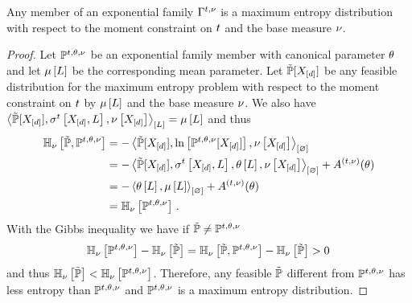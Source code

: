 \begin{lemma}\label{lem:expFamilyMaxEnt}
    Any member of an exponential family $\Gamma^{t,\nu}$ is a maximum entropy distribution with respect to the moment constraint on $t$ and the base measure $\nu$.
\end{lemma}
\begin{proof}
    Let $\mathbb{P}^{t,\theta,\nu}$ be an exponential family member with canonical parameter $\theta$ and let $\mu\left[L\right]$ be the corresponding mean parameter.
    Let $\tilde{\mathbb{P}}[X_{[d]}]$ be any feasible distribution for the maximum entropy problem with respect to the moment constraint on $t$ by $\mu\left[L\right]$ and the base measure $\nu$.
    We also have $\left\langle \tilde{\mathbb{P}}[X_{[d]}],\sigma^{t}\left[X_{[d]},L\right],\nu\left[X_{[d]}\right]\right\rangle_{\left[ L \right]}=\mu\left[L\right]$ and thus
    \begin{align*}
        \mathbb{H}_{\nu}\left[\tilde{\mathbb{P}},\mathbb{P}^{t,\theta,\nu}\right]
        &= -\left\langle \tilde{\mathbb{P}}[X_{[d]}],\ln \left[ \mathbb{P}^{t,\theta,\nu}[X_{[d]}] \right],\nu\left[X_{[d]}\right]\right\rangle_{\left[ \varnothing \right]} \\
        &= -\left\langle \tilde{\mathbb{P}}[X_{[d]}],\sigma^{t}\left[X_{[d]},L\right],\theta\left[L\right],\nu\left[X_{[d]}\right]\right\rangle_{\left[ \varnothing \right]} + A^{(t,\nu)}(\theta) \\
        &= - \left\langle \theta\left[L\right],\mu\left[L\right]\right\rangle_{\left[ \varnothing \right]} + A^{(t,\nu)}(\theta) \\
        &= \mathbb{H}_{\nu}\left[\mathbb{P}^{t,\theta,\nu}\right] \, .
    \end{align*}
    With the Gibbs inequality we have if $\tilde{\mathbb{P}}\neq\mathbb{P}^{t,\theta,\nu}$
    \begin{align*}
        \mathbb{H}_{\nu}\left[\mathbb{P}^{t,\theta,\nu}\right]  - \mathbb{H}_{\nu}\left[\tilde{\mathbb{P}}\right]
        = \mathbb{H}_{\nu}\left[\tilde{\mathbb{P}},\mathbb{P}^{t,\theta,\nu}\right]  - \mathbb{H}_{\nu}\left[\tilde{\mathbb{P}}\right]  > 0 \,
    \end{align*}
    and thus $\mathbb{H}_{\nu}\left[\tilde{\mathbb{P}}\right]<\mathbb{H}_{\nu}\left[\mathbb{P}^{t,\theta,\nu}\right]$.
    Therefore, any feasible $\tilde{\mathbb{P}}$ different from $\mathbb{P}^{t,\theta,\nu}$ has less entropy than $\mathbb{P}^{t,\theta,\nu}$ and $\mathbb{P}^{t,\theta,\nu}$ is a maximum entropy distribution.
\end{proof}

